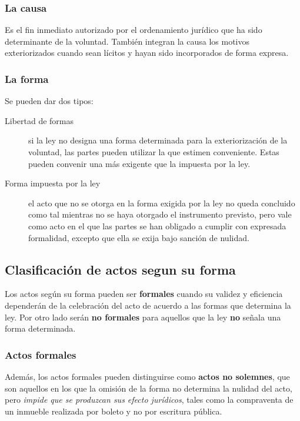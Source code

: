 \documentclass[../resumen.tex]{subfiles}
\begin{document}
\subsubsection{La causa}

Es el fin inmediato autorizado por el ordenamiento jurídico que ha sido determinante 
de la voluntad. También integran la causa los motivos exteriorizados cuando sean
lícitos y hayan sido incorporados de forma expresa.

\subsubsection{La forma}
Se pueden dar dos tipos:

\begin{description}
  \item[Libertad de formas] si la ley no designa una forma determinada para la
    exteriorización de la voluntad, las partes pueden utilizar la que estimen
    conveniente. Estas pueden convenir una más exigente que la impuesta por la ley.
  \item[Forma impuesta por la ley]  el acto que no se otorga en la forma exigida
    por la ley no queda concluido como tal mientras no se haya otorgado el 
    instrumento previsto, pero vale como acto en el que las partes se han 
    obligado a cumplir con expresada formalidad, excepto que ella se exija bajo
    sanción de nulidad.
\end{description}

\subsection{Clasificación de actos segun su forma}

Los actos según su forma pueden ser \textbf{formales} cuando su validez y eficiencia
dependerán de la celebración del acto de acuerdo a las formas que determina la
ley. Por otro lado serán \textbf{no formales} para aquellos que la ley \textbf{no}
señala una forma determinada.

\subsubsection{Actos formales}

Además, los actos formales pueden distinguirse como \textbf{actos no solemnes},
que son aquellos en los que la omisión de la forma no determina la nulidad del
acto, pero \textit{impide que se produzcan sus efecto jurídicos}, tales como
la compraventa de un inmueble realizada por boleto y no por escritura pública.
\end{document}
